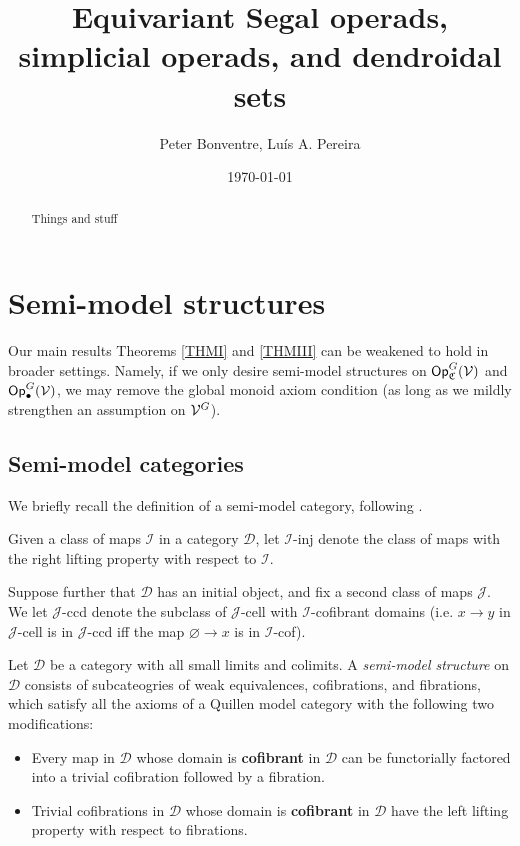 \documentclass[a4paper,10pt
]{article}%
\title{Equivariant Segal operads, simplicial operads, and dendroidal sets}
\author{Peter Bonventre, Lu\'is A. Pereira}%
\date{\today}
\renewcommand{\1}{\eta}%
\begin{document}
\maketitle

\begin{abstract}
      Things and stuff
\end{abstract}

\tableofcontents





\section{Semi-model structures}
\label{SMS_SEC}

Our main results Theorems \ref{THMI} and \ref{THMIII} can be weakened to hold in broader settings.
Namely, if we only desire semi-model structures on $\mathsf{Op}^G_{\mathfrak C}(\mathcal V)$ and $\mathsf{Op}_\bullet^G(\mathcal V)$, we may
remove the global monoid axiom condition (as long as we mildly strengthen an assumption on $\mathcal V^G$).

\subsection{Semi-model categories}

We briefly recall the definition of a semi-model category, following \cite{Spi01,Wh16}.

\begin{notation}
      Given a class of maps $\mathcal I$ in a category $\mathcal D$, let
      $\mathcal I$-inj denote the class of maps with the right lifting property with respect to $\mathcal I$.
      
      Suppose further that $\mathcal D$ has an initial object, and fix a second class of maps $\mathcal J$.
      We let $\mathcal J$-ccd denote
      the subclass of $\mathcal J$-cell with $\mathcal I$-cofibrant domains
      (i.e. $x \to y$ in $\mathcal J$-cell is in $\mathcal J$-ccd iff the map $\varnothing \to x$ is in $\mathcal I$-cof).
\end{notation}

Let $\mathcal D$ be a category with all small limits and colimits.
A \textit{semi-model structure} on $\mathcal D$ consists of
subcateogries of weak equivalences, cofibrations, and fibrations,
which satisfy all the axioms of a Quillen model category with the following two modifications:
\begin{itemize}
\item Every map in $\mathcal D$ whose domain is \textbf{cofibrant} in $\mathcal D$
      can be functorially factored into a trivial cofibration followed by a fibration.
\item Trivial cofibrations in $\mathcal D$ whose domain is \textbf{cofibrant} in $\mathcal D$
      have the left lifting property with respect to fibrations.
\end{itemize}
\end{document}
